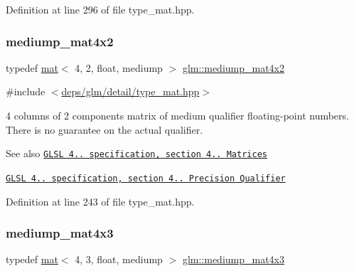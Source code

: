 Definition at line 296 of file type\+\_\+mat.\+hpp.

\mbox{\label{group__core__precision_gaf0c9bd4c952160fa6f63ae8ab243beea}} 
\subsubsection{\texorpdfstring{mediump\+\_\+mat4x2}{mediump\_mat4x2}}
{\footnotesize\ttfamily typedef \hyperlink{structglm_1_1mat}{mat}$<$ 4, 2, float, mediump $>$ \hyperlink{group__core__precision_gaf0c9bd4c952160fa6f63ae8ab243beea}{glm\+::mediump\+\_\+mat4x2}}



{\ttfamily \#include $<$\hyperlink{type__mat_8hpp}{deps/glm/detail/type\+\_\+mat.\+hpp}$>$}

4 columns of 2 components matrix of medium qualifier floating-\/point numbers. There is no guarantee on the actual qualifier.

\begin{DoxySeeAlso}{See also}
\href{http://www.opengl.org/registry/doc/GLSLangSpec.4.20.8.pdf}{\tt G\+L\+SL 4.. specification, section 4.. Matrices} 

\href{http://www.opengl.org/registry/doc/GLSLangSpec.4.20.8.pdf}{\tt G\+L\+SL 4.. specification, section 4.. Precision Qualifier} 
\end{DoxySeeAlso}


Definition at line 243 of file type\+\_\+mat.\+hpp.

\mbox{\label{group__core__precision_ga2d5eb7a43e7564b4e048512b8488994a}} 
\subsubsection{\texorpdfstring{mediump\+\_\+mat4x3}{mediump\_mat4x3}}
{\footnotesize\ttfamily typedef \hyperlink{structglm_1_1mat}{mat}$<$ 4, 3, float, mediump $>$ \hyperlink{group__core__precision_ga2d5eb7a43e7564b4e048512b8488994a}{glm\+::mediump\+\_\+mat4x3}}



